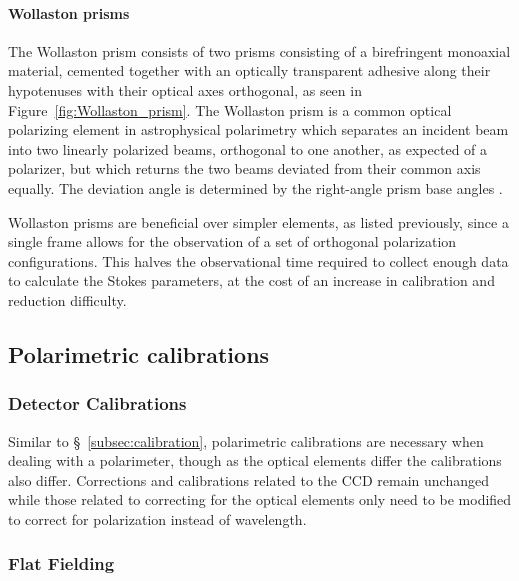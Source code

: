 \paragraph{Wollaston prisms}
The Wollaston prism consists of two prisms consisting of a birefringent monoaxial material, cemented together with an optically transparent adhesive along their hypotenuses with their optical axes orthogonal, as seen in Figure~\ref{fig:Wollaston_prism}. The Wollaston prism is a common optical polarizing element in astrophysical polarimetry which separates an incident beam into two linearly polarized beams, orthogonal to one another, as expected of a polarizer, but which returns the two beams deviated from their common axis equally. The deviation angle is determined by the right-angle prism base angles \citep{wollaston}.
\prgph

Wollaston prisms are beneficial over simpler elements, as listed previously, since a single frame allows for the observation of a set of orthogonal polarization configurations. This halves the observational time required to collect enough data to calculate the Stokes parameters, at the cost of an increase in calibration and reduction difficulty.

\subsection{Polarimetric calibrations}\label{subsec:pol_cal}

\subsubsection{Detector Calibrations}\label{subsubsec:pol_detector}

Similar to \S~\ref{subsec:calibration}, polarimetric calibrations are necessary when dealing with a polarimeter, though as the optical elements differ the calibrations also differ. Corrections and calibrations related to the \gls{CCD} remain unchanged while those related to correcting for the optical elements only need to be modified to correct for polarization instead of wavelength.


\subsubsection{Flat Fielding}\label{subsubsec:pol_flat}

